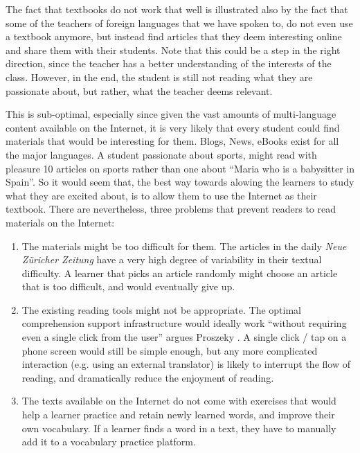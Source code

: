 

The fact that textbooks do not work that well is illustrated also by the fact that some of the teachers of foreign languages that we have spoken to, do not even use a textbook anymore, but instead find articles that they deem interesting online and share them with their students. Note that this could be a step in the right direction, since the teacher has a better understanding of the interests of the class. However, in the end, the student is still not reading what they are passionate about, but rather, what the teacher deems relevant. 

This is sub-optimal, especially since given the vast amounts of multi-language content available on the Internet, it is very likely that every student could find materials that would be interesting for them. Blogs, News, eBooks exist for all the major languages. A student passionate about sports, might read with pleasure 10 articles on sports rather than one about ``Maria who is a babysitter in Spain''. So it would seem that, the best way towards alowing the learners to study what they are excited about, is to allow them to use the Internet as their textbook. There are nevertheless, three problems that prevent readers to read materials on the Internet:

\begin{enumerate}
	
  \item The materials might be too difficult for them. The articles in the  daily {\em Neue Z\"uricher Zeitung} have a very high degree of variability in their textual difficulty. A learner that picks an article randomly might choose an article that is too difficult, and would eventually give up. 

  \item The existing reading tools might not be appropriate. The optimal comprehension support infrastructure would ideally work ``without requiring even a single click from the user'' argues Proszeky \cite{Proszeky02-Comprehension}. A single click / tap on a phone screen would still be simple enough, but any more complicated interaction (e.g. using an external translator) is likely to interrupt the flow of reading, and dramatically reduce the enjoyment of reading. 
  
  \item The texts available on the Internet do not come with exercises that would help a learner practice and retain newly learned words, and improve their own vocabulary. If a learner finds a word in a text, they have to manually add it to a vocabulary practice platform. 
  
\end{enumerate}

